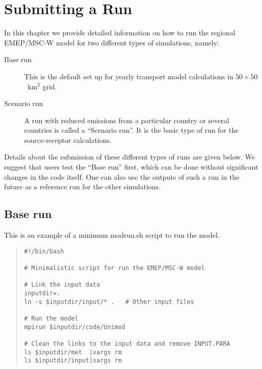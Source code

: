 \chapter{Submitting a Run}
\label{ch:SubmitARun}

In this chapter we provide detailed information on how to run the
regional EMEP/MSC-W model for two different types of simulations, namely: 

\begin{description}
\item[Base run]
This is the default set up for yearly transport model calculations
in $50\times50$~km$^2$ grid. 
\item[Scenario run]
 A run with reduced emissions from a particular country or several
 countries is called 
a ``Scenario run''. It is the basic type of run for the source-receptor
calculations. 
\end{description}

\noindent
Details about the submission of these
different types of runs are given below. We suggest that users test
the ``Base run'' first, which can be done without significant changes in
the code itself. One can also use the outputs of such a run in the
future as a reference run for the other simulations.\\  
% 

\newpage
\section{Base run}

This is an example of a minimum modrun.sh script to run the model.

\begin{quote}
\begin{verbatim}
#!/bin/bash

# Minimalistic script for run the EMEP/MSC-W model

# Link the input data
inputdir=.
ln -s $inputdir/input/* .   # Other input files

# Run the model
mpirun $inputdir/code/Unimod

# Clean the links to the input data and remove INPUT.PARA
ls $inputdir/met  |xargs rm
ls $inputdir/input|xargs rm

\end{verbatim}
\end{quote}

